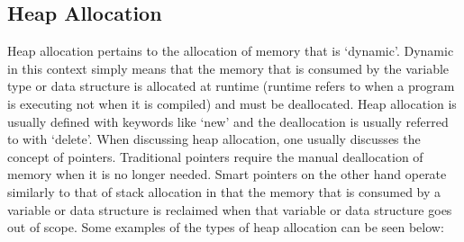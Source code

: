 \subsection*{Heap Allocation}

Heap allocation pertains to the allocation of memory that is `dynamic'. Dynamic in this context simply means that the memory that is consumed by the variable type or data structure is allocated at runtime
(runtime refers to when a program is executing not when it is compiled) and must be deallocated. Heap allocation is usually defined with keywords like `new' and the deallocation is usually referred to with
`delete'. When discussing heap allocation, one usually discusses the concept of pointers. Traditional pointers require the manual deallocation of memory when it is no longer needed. Smart pointers on the other
hand operate similarly to that of stack allocation in that the memory that is consumed by a variable or data structure is reclaimed when that variable or data structure goes out of scope. Some examples of the
types of heap allocation can be seen below:

